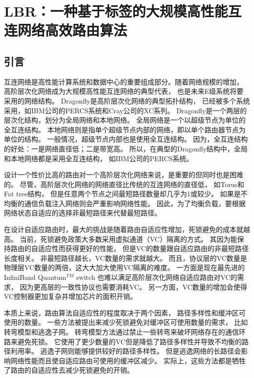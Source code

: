 \chapter{LBR：一种基于标签的大规模高性能互连网络高效路由算法}

\section{引言}

互连网络是高性能计算系统和数据中心的重要组成部分。随着网络规模的增加，
高阶层次化网络成为大规模高性能互连网络的典型代表，
也是未来E级系统将要采用的网络结构。
Dragonfly是高阶层次化网络的典型拓扑结构，
已经被多个系统采用，如IBM公司的PERCS系统和Cray公司的XC系列。
Dragonfly是一个两层的层次化结构，划分为全局网络和本地网络。
全局网络是一个以超级节点为单位的全互连结构。
本地网络则是指单个超级节点内部的网络，即以单个路由器节点为单位的结构。
一般情况，超级节点内部也是使用全互连结构。
因为，全互连结构的好处：一是网络直径低；二是带宽高。
所以，在典型的Dragonfly结构中，全局和本地网络都是采用全互连结构，
如IBM公司的PERCS系统。

设计一个性价比高的路由对一个高阶层次化网络来说，是重要的但同时也是困难的。
尽管，高阶层次化网络的网络直径比传统的互连网络的直径低，
如Torus和Fat tree结构，
但是任意两个节点之间最短路径数量却几乎为1或较少。
如果是不均衡的通信负载注入网络则会严重影响网络性能。
因此，为了均衡负载，要根据网络状态自适应的选择非最短路径来代替最短路径。

在设计自适应路由时，最大的挑战是随着路由自适应性增加，死锁避免的成本就越高。
当前，死锁避免政策大多数采用虚拟通道（VC）隔离的方式。
其因为能保持路由的自适应性而获得更好的性能，
但是VC的数量跟自适应路由的非最短路径长度相关。
非最短路径越长，VC数量的需求就越大。
而且，协议层的VC数量是物理层VC数量的两倍，这大大加大使用VC隔离的难度。
一方面是现在最先进的InfiniBand Quantum$^{TM}$ switch
也难以满足高阶层次化网络自适应路由对VC的需求，
因为更高层的一致性协议也需要消耗VC。
另一方面，VC数量的增加会使得VC控制器更加复杂并增加芯片的面积开销。

本质上来说，路由算法自适应性的程度取决于两个因素，
路径多样性和缓冲区可使用的数量。
一些方法被提出来减少死锁避免对缓冲区可使用数量的需求，
比如转弯模型和逃逸子网。
转弯模型方法通过禁止一些转弯来破坏网络存在的通信环路来避免死锁。
它使用了更少数量的VC但是降低了路径多样性并导致不均衡的路径利用率。
逃逸子网则能够提供较好的路径多样性。
但是逃逸网络的长路径会影响网络性能而且使自适应路由可使用的缓冲区减少。
实际上，这些方法都是牺牲了路由的自适应性去减少死锁避免的开销。


